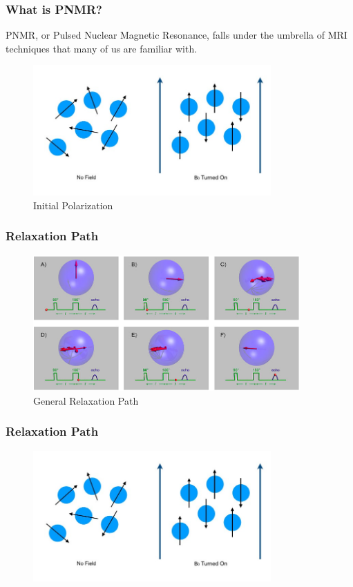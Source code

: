 \begin{frame}[fragile]
  \frametitle{What is PNMR?}
  PNMR, or Pulsed Nuclear Magnetic Resonance, falls under the umbrella of MRI techniques that many of us are familiar with. 
  \begin{figure}
  \begin{center}
        \includegraphics[height=5cm]{./images/polarization.jpeg}
\end{center}
\caption{Initial Polarization \cite{init_polar}}
\label{fig:relax}
\end{figure}
\end{frame}

\begin{frame}
  \frametitle{Relaxation Path}
  \begin{figure}[htbp!]
    \begin{center}
      \includegraphics[height=5.2cm]{./images/figures/theory/relax.png}
    \end{center}
          \caption{General Relaxation Path \cite{spin_echo}}
    \label{fig:relax}
  \end{figure}
\end{frame}

\begin{frame}
  \frametitle{Relaxation Path}
  \begin{figure}
  \begin{center}
    \includegraphics[height=5cm]{./images/polarization.jpeg}
  \end{center}
    \caption{\cite{spin_echo}}
    \label{fig:animate}
\end{figure}
\end{frame}
